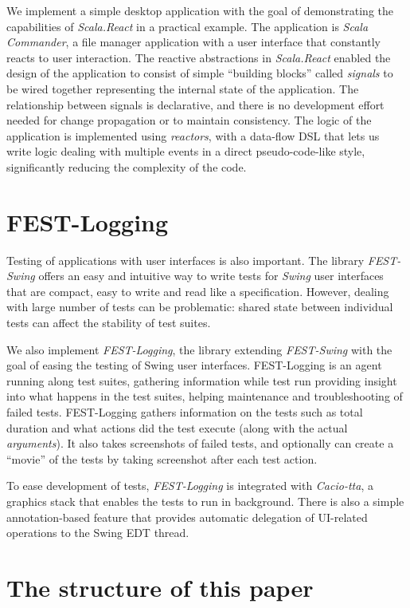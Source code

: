 We implement a simple desktop application with the goal of demonstrating the capabilities of \emph{Scala.React} in a practical example. The application is \emph{Scala Commander}, a file manager application with a user interface that constantly reacts to user interaction. The reactive abstractions in \emph{Scala.React} enabled the design of the application to consist of simple ``building blocks'' called \emph{signals} to be wired together representing the internal state of the application. The relationship between signals is declarative, and there is no development effort needed for change propagation or to maintain consistency. The logic of the application is implemented using \emph{reactors}, with a data-flow DSL that lets us write logic dealing with multiple events in a direct pseudo-code-like style, significantly reducing the complexity of the code.

\section{FEST-Logging}

Testing of applications with user interfaces is also important. The library \emph{FEST-Swing} offers an easy and intuitive way to write tests for \emph{Swing} user interfaces that are compact, easy to write and read like a specification. However, dealing with large number of tests can be problematic: shared state between individual tests can affect the stability of test suites. 

We also implement \emph{FEST-Logging}, the library extending \emph{FEST-Swing} with the goal of easing the testing of Swing user interfaces. FEST-Logging is an agent running along test suites, gathering information while test run providing insight into what happens in the test suites, helping maintenance and troubleshooting of failed tests. FEST-Logging gathers information on the tests such as total duration and what actions did the test execute (along with the actual \emph{arguments}). It also takes screenshots of failed tests, and optionally can create a ``movie'' of the tests by taking screenshot after each test action.

To ease development of tests, \emph{FEST-Logging} is integrated with \emph{Cacio-tta}, a graphics stack that enables the tests to run in background. There is also a simple annotation-based feature that provides automatic delegation of UI-related operations to the Swing EDT thread.

\section{The structure of this paper}

